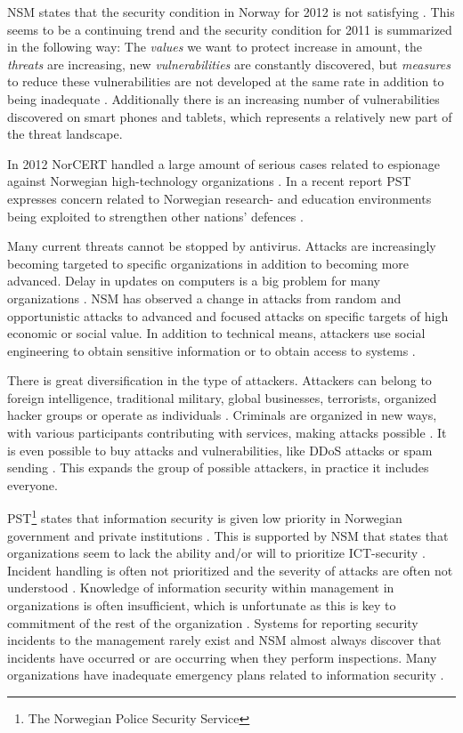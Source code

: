 \acs{NSM} states that the security condition in Norway for 2012 is not satisfying \cite{samordnaVurdering}. This seems to be a continuing trend and the security condition for 2011 is summarized in the following way: The \textit{values} we want to protect increase in amount, the \textit{threats} are increasing, new \textit{vulnerabilities} are constantly discovered, but \textit{measures} to reduce these vulnerabilities are not developed at the same rate in addition to being inadequate \cite{NSMRapport}. Additionally there is an increasing number of vulnerabilities discovered on smart phones and tablets, which represents a relatively new part of the threat landscape.

In 2012 \acs{NorCERT} handled a large amount of serious cases related to espionage against Norwegian high-technology organizations \cite{NorCERT3Kvartal2012}. In a recent report PST expresses concern related to Norwegian research- and education environments being exploited to strengthen other nations' defences \cite{PSTvurdering2013}.   

Many current threats cannot be stopped by antivirus. Attacks are increasingly becoming targeted to specific organizations in addition to becoming more advanced. Delay in updates on computers is a big problem for many organizations \cite{NorCERT2Kvartal2012}. \acs{NSM} has observed a change in attacks from random and opportunistic attacks to advanced and focused attacks on specific targets of high economic or social value. In addition to technical means, attackers use social engineering to obtain sensitive information or to obtain access to systems \cite{NSMRapport}.  

There is great diversification in the type of attackers. Attackers can belong to foreign intelligence, traditional military, global businesses, terrorists, organized hacker groups or operate as individuals \cite{samordnaVurdering}. Criminals are organized in new ways, with various participants contributing with services, making attacks possible \cite{KriposTrender}. It is even possible to buy attacks and vulnerabilities, like \ac{DDoS} attacks or spam sending \cite{NorCERT2Kvartal2012}. This expands the group of possible attackers, in practice it includes everyone. 

PST\footnote{The Norwegian Police Security Service} states that information security is given low priority in Norwegian government and private institutions \cite{PSTvurdering}. This is supported by \acs{NSM} that states that organizations seem to lack the ability and/or will to prioritize ICT-security \cite{NSMmelding}. Incident handling is often not prioritized and the severity of attacks are often not understood \cite{NorCERT2Kvartal2012}. Knowledge of information security within management in organizations is often insufficient, which is unfortunate as this is key to commitment of the rest of the organization \cite{NorCERT3Kvartal2012}. Systems for reporting security incidents to the management rarely exist and \acs{NSM} almost always discover that incidents have occurred or are occurring when they perform inspections. Many organizations have inadequate emergency plans related to information security \cite{NSMRapport}.

